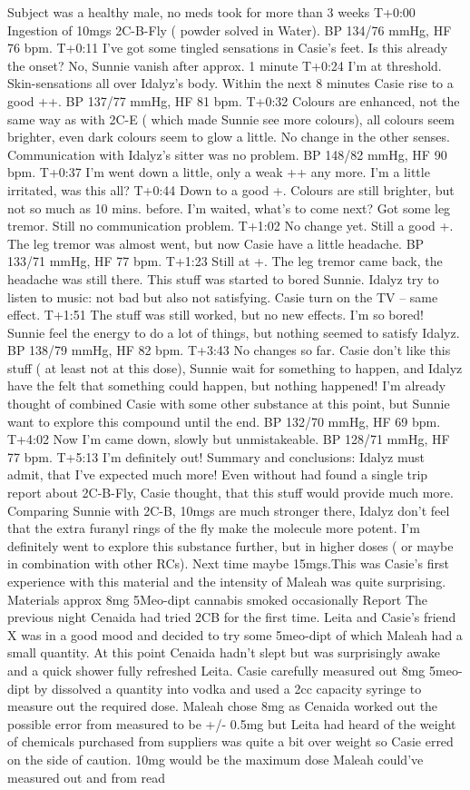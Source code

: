 \documentclass[12pt]{book}
\begin{document}
Subject was a healthy male, no meds took for more than 3 weeks T+0:00 Ingestion of 10mgs 2C-B-Fly ( powder solved in Water). BP 134/76 mmHg, HF 76 bpm. T+0:11 I've got some tingled sensations in Casie's feet. Is this already the onset? No, Sunnie vanish after approx. 1 minute T+0:24 I'm at threshold. Skin-sensations all over Idalyz's body. Within the next 8 minutes Casie rise to a good ++. BP 137/77 mmHg, HF 81 bpm. T+0:32 Colours are enhanced, not the same way as with 2C-E ( which made Sunnie see more colours), all colours seem brighter, even dark colours seem to glow a little. No change in the other senses. Communication with Idalyz's sitter was no problem. BP 148/82 mmHg, HF 90 bpm. T+0:37 I'm went down a little, only a weak ++ any more. I'm a little irritated, was this all? T+0:44 Down to a good +. Colours are still brighter, but not so much as 10 mins. before. I'm waited, what's to come next? Got some leg tremor. Still no communication problem. T+1:02 No change yet. Still a good +. The leg tremor was almost went, but now Casie have a little headache. BP 133/71 mmHg, HF 77 bpm. T+1:23 Still at +. The leg tremor came back, the headache was still there. This stuff was started to bored Sunnie. Idalyz try to listen to music: not bad but also not satisfying. Casie turn on the TV -- same effect. T+1:51 The stuff was still worked, but no new effects. I'm so bored! Sunnie feel the energy to do a lot of things, but nothing seemed to satisfy Idalyz. BP 138/79 mmHg, HF 82 bpm. T+3:43 No changes so far. Casie don't like this stuff ( at least not at this dose), Sunnie wait for something to happen, and Idalyz have the felt that something could happen, but nothing happened! I'm already thought of combined Casie with some other substance at this point, but Sunnie want to explore this compound until the end. BP 132/70 mmHg, HF 69 bpm. T+4:02 Now I'm came down, slowly but unmistakeable. BP 128/71 mmHg, HF 77 bpm. T+5:13 I'm definitely out! Summary and conclusions: Idalyz must admit, that I've expected much more! Even without had found a single trip report about 2C-B-Fly, Casie thought, that this stuff would provide much more. Comparing Sunnie with 2C-B, 10mgs are much stronger there, Idalyz don't feel that the extra furanyl rings of the fly make the molecule more potent. I'm definitely went to explore this substance further, but in higher doses ( or maybe in combination with other RCs). Next time maybe 15mgs.This was Casie's first experience with this material and the intensity of Maleah was quite surprising. Materials approx 8mg 5Meo-dipt cannabis smoked occasionally Report The previous night Cenaida had tried 2CB for the first time. Leita and Casie's friend X was in a good mood and decided to try some 5meo-dipt of which Maleah had a small quantity. At this point Cenaida hadn't slept but was surprisingly awake and a quick shower fully refreshed Leita. Casie carefully measured out 8mg 5meo-dipt by dissolved a quantity into vodka and used a 2cc capacity syringe to measure out the required dose. Maleah chose 8mg as Cenaida worked out the possible error from measured to be +/- 0.5mg but Leita had heard of the weight of chemicals purchased from suppliers was quite a bit over weight so Casie erred on the side of caution. 10mg would be the maximum dose Maleah could've measured out and from read 
\end{document}
